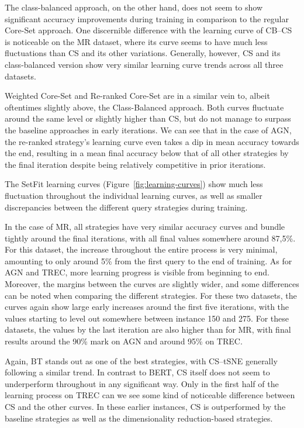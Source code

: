 \documentclass[english,bachelor,ul]{webisthesis} %
\begin{document}
The class-balanced approach, on the other hand, does not seem to show significant accuracy improvements during training in comparison to the regular Core-Set approach. One discernible difference with the learning curve of CB--CS is noticeable on the MR dataset, where its curve seems to have much less fluctuations than CS and its other variations. Generally, however, CS and its class-balanced version show very similar learning curve trends across all three datasets. 

Weighted Core-Set and Re-ranked Core-Set are in a similar vein to, albeit oftentimes slightly above, the Class-Balanced approach. Both curves fluctuate around the same level or slightly higher than CS, but do not manage to surpass the baseline approaches in early iterations. We can see that in the case of AGN, the re-ranked strategy's learning curve even takes a dip in mean accuracy towards the end, resulting in a mean final accuracy below that of all other strategies by the final iteration despite being relatively competitive in prior iterations.

The SetFit learning curves (Figure~\ref{fig:learning-curves}) show much less fluctuation throughout the individual learning curves, as well as smaller discrepancies between the different query strategies during training. 

In the case of MR, all strategies have very similar accuracy curves and bundle tightly around the final iterations, with all final values somewhere around 87,5\%. For this dataset, the increase throughout the entire process is very minimal, amounting to only around 5\% from the first query to the end of training. As for AGN and TREC, more learning progress is visible from beginning to end. Moreover, the margins between the curves are slightly wider, and some differences can be noted when comparing the different strategies. For these two datasets, the curves again show large early increases around the first five iterations, with the values starting to level out somewhere between instance 150 and 275. For these datasets, the values by the last iteration are also higher than for MR, with final results around the 90\% mark on AGN and around 95\% on TREC.

Again, BT stands out as one of the best strategies, with CS--tSNE generally following a similar trend. In contrast to BERT, CS itself does not seem to underperform throughout in any significant way. Only in the first half of the learning process on TREC can we see some kind of noticeable difference between CS and the other curves. In these earlier instances, CS is outperformed by the baseline strategies as well as the dimensionality reduction-based strategies. 
\end{document}
